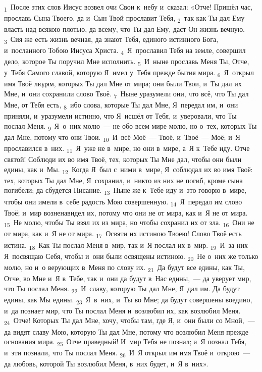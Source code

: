 \documentclass[a4paper,12pt]{article}
\begin{document}
\textsubscript{1}~После этих слов Иисус возвел очи Свои к~небу и~сказал: «Отче! Пришёл час, прославь Сына Твоего, да и~Сын Твой прославит Тебя,
\textsubscript{2}~так как Ты дал Ему власть над всякою плотью, да всему, что Ты дал Ему, даст Он жизнь вечную.
\textsubscript{3}~Сия же есть жизнь вечная, да знают Тебя, единого истинного Бога, и~посланного Тобою Иисуса Христа.
\textsubscript{4}~Я~прославил Тебя на земле, совершил дело, которое Ты поручил Мне исполнить.
\textsubscript{5}~И~ныне прославь Меня Ты, Отче, у~Тебя Самого славой, которую Я~имел у~Тебя прежде бытия мира.
\textsubscript{6}~Я~открыл имя Твоё людям, которых Ты дал Мне от мира; они были Твои, и~Ты дал их Мне, и~они сохранили слово Твоё.
\textsubscript{7}~Ныне уразумели они, что всё, что Ты дал Мне, от Тебя есть,
\textsubscript{8}~ибо слова, которые Ты дал Мне, Я~передал им, и~они приняли, и~уразумели истинно, что Я~исшёл от Тебя, и~уверовали, что Ты послал Меня.
\textsubscript{9}~Я~о~них молю~--- не обо всем мире молю, но о~тех, которых Ты дал Мне, потому что они Твои.
\textsubscript{10}~И~всё Моё~--- Твоё, и~Твоё~--- Моё; и~Я прославился в~них.
\textsubscript{11}~Я~уже не в~мире, но они в~мире, а~Я к~Тебе иду. Отче святой! Соблюди их во имя Твоё, тех, которых Ты Мне дал, чтобы они были едины, как и~Мы.
\textsubscript{12}~Когда Я~был с~ними в~мире, Я~соблюдал их во имя Твоё: тех, которых Ты дал Мне, Я~сохранил, и~никто из них не погиб, кроме сына погибели; да сбудется Писание.
\textsubscript{13}~Ныне же к~Тебе иду и~это говорю в~мире, чтобы они имели в~себе радость Мою совершенную.
\textsubscript{14}~Я~передал им слово Твоё; и~мир возненавидел их, потому что они не от мира, как и~Я не от мира.
\textsubscript{15}~Не молю, чтобы Ты взял их из мира, но чтобы сохранил их от зла.
\textsubscript{16}~Они не от мира, как и~Я не от мира.
\textsubscript{17}~Освяти их истиною Твоею! Слово Твоё есть истина.
\textsubscript{18}~Как Ты послал Меня в~мир, так и~Я послал их в~мир.
\textsubscript{19}~И~за них Я~посвящаю Себя, чтобы и~они были освящены истиною.
\textsubscript{20}~Не о~них же только молю, но и~о верующих в~Меня по слову их.
\textsubscript{21}~Да будут все едины, как Ты, Отче, во Мне и~Я в~Тебе, так и~они да будут в~Нас едины,~--- да уверует мир, что Ты послал Меня.
\textsubscript{22}~И~славу, которую Ты дал Мне, Я~дал им. Да будут едины, как Мы едины.
\textsubscript{23}~Я~в~них, и~Ты во Мне; да будут совершены воедино, и~да познает мир, что Ты послал Меня и~возлюбил их, как возлюбил Меня.
\textsubscript{24}~Отче! Которых Ты дал Мне, хочу, чтобы там, где Я, и~они были со Мной,~--- да видят славу Мою, которую Ты дал Мне, потому что возлюбил Меня прежде основания мира.
\textsubscript{25}~Отче праведный! И~мир Тебя не познал; а~Я познал Тебя, и~эти познали, что Ты послал Меня.
\textsubscript{26}~И~Я открыл им имя Твоё и~открою~--- да любовь, которой Ты возлюбил Меня, в~них будет, и~Я в~них». 
\end{document}
